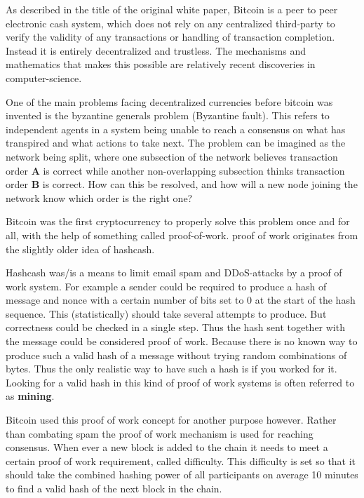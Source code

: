 As described in the title of the original white paper\cite{nakamoto_bitcoin}, Bitcoin is a peer to peer electronic cash system, which does not rely on any centralized third-party to verify the validity of any transactions or handling of transaction completion. Instead it is entirely decentralized and trustless. The mechanisms and mathematics that makes this possible are relatively recent discoveries in computer-science. 


One of the main problems facing decentralized currencies before bitcoin was invented is the byzantine generals problem (Byzantine fault). This refers to independent agents in a system being unable to reach a consensus on what has transpired and what actions to take next. The problem can be imagined as the network being split, where one subsection of the network believes transaction order \textbf{A} is correct while another non-overlapping subsection thinks transaction order \textbf{B} is correct. How can this be resolved, and how will a new node joining the network know which order is the right one?

Bitcoin was the first cryptocurrency to properly solve this problem once and for all, with the help of something called proof-of-work. proof of work originates from the slightly older idea of hashcash. 

Hashcash was/is a means to limit email spam and DDoS-attacks by a proof of work system. For example a sender could be required to produce a hash of message and nonce with a certain number of bits set to 0 at the start of the hash sequence. This (statistically) should take several attempts to produce. But correctness could be checked in a single step. Thus the hash sent together with the message could be considered proof of work. Because there is no known way to produce such a valid hash of a message without trying random combinations of bytes. Thus the only realistic way to have such a hash is if you worked for it. Looking for a valid hash in this kind of proof of work systems is often referred to as \textbf{mining}.

Bitcoin used this proof of work concept for another purpose however. Rather than combating spam the proof of work mechanism is used for reaching consensus. When ever a new block is added to the chain it needs to meet a certain proof of work requirement, called difficulty. This difficulty is set so that it should take the combined hashing power of all participants on average 10 minutes to find a valid hash of the next block in the chain.

